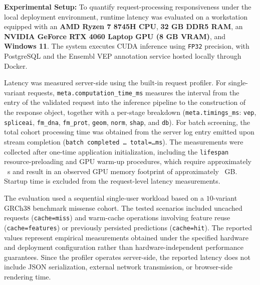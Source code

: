 \textbf{Experimental Setup:} To quantify request-processing responsiveness under the local deployment environment, runtime latency was evaluated on a workstation equipped with an \textbf{AMD Ryzen 7 8745H CPU}, \textbf{32 GB DDR5 RAM}, an \textbf{NVIDIA GeForce RTX 4060 Laptop GPU (8 GB VRAM)}, and \textbf{Windows 11}. The system executes CUDA inference using \texttt{FP32} precision, with PostgreSQL and the Ensembl VEP annotation service hosted locally through Docker.

Latency was measured server-side using the built-in request profiler. For single-variant requests, \texttt{meta.computation\_time\_ms} measures the interval from the entry of the validated request into the inference pipeline to the construction of the response object, together with a per-stage breakdown (\texttt{meta.timings\_ms}: \texttt{vep}, \texttt{spliceai}, \texttt{fm\_dna}, \texttt{fm\_prot}, \texttt{geom}, \texttt{norm}, \texttt{shap}, and \texttt{db}). For batch screening, the total cohort processing time was obtained from the server log entry emitted upon stream completion (\texttt{batch completed \ldots{} total=\ldots ms}). The measurements were collected after one-time application initialization, including the \texttt{lifespan} resource-preloading and GPU warm-up procedures, which require approximately \tbd{}~s and result in an observed GPU memory footprint of approximately \tbd{}~GB. %
Startup time is excluded from the request-level latency measurements.

The evaluation used a sequential single-user workload based on a $10$-variant GRCh38 benchmark missense cohort. The tested scenarios included uncached requests (\texttt{cache=miss}) and warm-cache operations involving feature reuse (\texttt{cache=features}) or previously persisted predictions (\texttt{cache=hit}). The reported values represent empirical measurements obtained under the specified hardware and deployment configuration rather than hardware-independent performance guarantees. Since the profiler operates server-side, the reported latency does not include JSON serialization, external network transmission, or browser-side rendering time.

